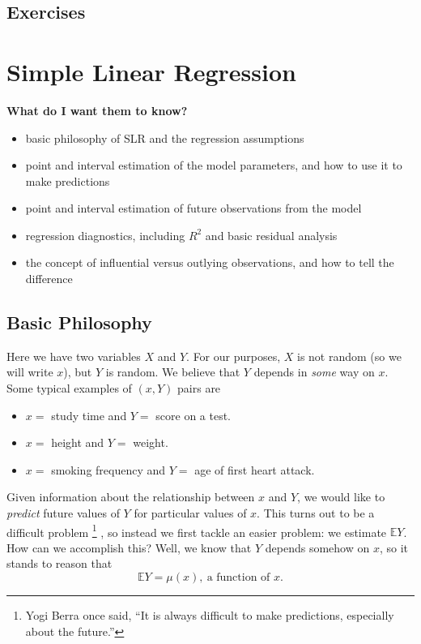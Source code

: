 \documentclass[captions=tableheading]{scrbook}
\begin{document}
\begin{figure}[th]
  \label{fig-power-examp}
\end{figure}


\newpage{}
\section{Exercises}
\label{sec-10-8}


\setcounter{thm}{0}
\chapter{Simple Linear Regression}
\label{sec-11}
\label{cha-simple-linear-regression}


\textbf{What do I want them to know?}

\begin{itemize}
\item basic philosophy of SLR and the regression assumptions
\item point and interval estimation of the model parameters, and how to use it to make predictions
\item point and interval estimation of future observations from the model
\item regression diagnostics, including \( R^{2} \) and basic residual analysis
\item the concept of influential versus outlying observations, and how to tell the difference
\end{itemize}
\section{Basic Philosophy}
\label{sec-11-1}
\label{sec-Basic-Philosophy}


Here we have two variables \(X\) and \(Y\). For our purposes, \(X\) is not random (so we will write \(x\)), but \(Y\) is random. We believe that \(Y\) depends in \emph{some} way on \(x\). Some typical examples of \( (x,Y) \) pairs are

\begin{itemize}
\item \( x = \) study time and \( Y = \) score on a test.
\item \( x = \) height and \( Y = \) weight.
\item \( x = \) smoking frequency and \( Y = \) age of first heart attack.
\end{itemize}

Given information about the relationship between \(x\) and \(Y\), we would like to \emph{predict} future values of \(Y\) for particular values of \(x\). This turns out to be a difficult problem \!\!
\footnote{Yogi Berra once said, ``It is always difficult to make predictions, especially about the future.''}
, so instead we first tackle an easier problem: we estimate \( \mathbb{E} Y \). How can we accomplish this? Well, we know that \(Y\) depends somehow on \(x\), so it stands to reason that
\begin{equation}
\mathbb{E} Y = \mu(x),\ \mbox{a function of }x.
\end{equation}
\end{document}
